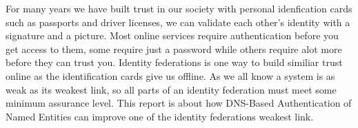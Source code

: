 For many years we have built trust in our society with personal idenfication cards such as passports and driver licenses, we can validate each other's identity with a signature and a picture.
Most online services require authentication before you get access to them, some require just a password while others require alot more before they can trust you.
Identity federations is one way to build similiar trust online as the identification cards give us offline.
As we all know a system is as weak as its weakest link, so all parts of an identity federation must meet some minimum assurance level.
This report is about how DNS-Based Authentication of Named Entities can improve one of the identity federations weakest link.





